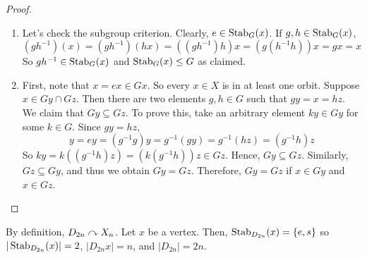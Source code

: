 \documentclass[10pt, a4paper, twoside]{report}
\begin{document}
\begin{proof} \item[] 
    \begin{enumerate}
        \item Let's check the subgroup criterion. Clearly, \(e\in\operatorname{Stab}_G(x)\). If \(g,h\in\operatorname{Stab}_G(x)\),
        \[(gh^{-1})(x)=(gh^{-1})(hx)=((gh^{-1})h)x=(g(h^{-1}h))x=gx=x\]
        So \(gh^{-1}\in\operatorname{Stab}_G(x)\) and \(\operatorname{Stab}_G(x)\leq G\) as claimed. 
        \item First, note that \(x=ex\in Gx\). So every \(x\in X\) is in at least one orbit. Suppose \(x\in Gy\cap Gz\). Then there are two elements \(g,h\in G\) such that \(gy=x=hz\). We claim that \(Gy\subseteq Gz\). To prove this, take an arbitrary element \(ky\in Gy\) for some \(k\in G\). Since \(gy=hz\),
        \[y=ey=(g^{-1}g)y=g^{-1}(gy)=g^{-1}(hz)=(g^{-1}h)z\]
        So \(ky=k((g^{-1}h)z)=(k(g^{-1}h))z\in Gz\). Hence, \(Gy\subseteq Gz\). Similarly, \(Gz\subseteq Gy\), and thus we obtain \(Gy=Gz\). Therefore, \(Gy=Gz\) if \(x\in Gy\) and \(x\in Gz\). 
    \end{enumerate}
\end{proof}
\begin{example}
    By definition, \(D_{2n}\curvearrowright X_n\). Let \(x\) be a vertex. Then, \(\operatorname{Stab}_{D_{2n}}(x)=\{e,s\}\) so \(|\operatorname{Stab}_{D_{2n}}(x)|=2\), \(|D_{2n}x|=n\), and \(|D_{2n}|=2n\).
    \label{eg:dihedral_stab}
\end{example}
\end{document}
